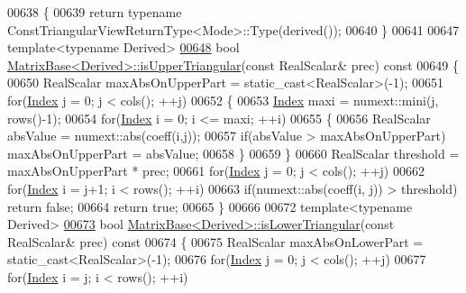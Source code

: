 \begin{DoxyCode}
00638 \textcolor{keyword}{}\{
00639   \textcolor{keywordflow}{return} \textcolor{keyword}{typename} ConstTriangularViewReturnType<Mode>::Type(derived());
00640 \}
00641 
00647 \textcolor{keyword}{template}<\textcolor{keyword}{typename} Derived>
\hyperlink{group___core___module_aae3ec1660bb4ac584220481c54ab4a64}{00648} \textcolor{keywordtype}{bool} \hyperlink{group___core___module_aae3ec1660bb4ac584220481c54ab4a64}{MatrixBase<Derived>::isUpperTriangular}(\textcolor{keyword}{const} RealScalar& prec)\textcolor{keyword}{
       const}
00649 \textcolor{keyword}{}\{
00650   RealScalar maxAbsOnUpperPart = \textcolor{keyword}{static\_cast<}RealScalar\textcolor{keyword}{>}(-1);
00651   \textcolor{keywordflow}{for}(\hyperlink{namespace_eigen_a62e77e0933482dafde8fe197d9a2cfde}{Index} j = 0; j < cols(); ++j)
00652   \{
00653     \hyperlink{namespace_eigen_a62e77e0933482dafde8fe197d9a2cfde}{Index} maxi = numext::mini(j, rows()-1);
00654     \textcolor{keywordflow}{for}(\hyperlink{namespace_eigen_a62e77e0933482dafde8fe197d9a2cfde}{Index} i = 0; i <= maxi; ++i)
00655     \{
00656       RealScalar absValue = numext::abs(coeff(i,j));
00657       \textcolor{keywordflow}{if}(absValue > maxAbsOnUpperPart) maxAbsOnUpperPart = absValue;
00658     \}
00659   \}
00660   RealScalar threshold = maxAbsOnUpperPart * prec;
00661   \textcolor{keywordflow}{for}(\hyperlink{namespace_eigen_a62e77e0933482dafde8fe197d9a2cfde}{Index} j = 0; j < cols(); ++j)
00662     \textcolor{keywordflow}{for}(\hyperlink{namespace_eigen_a62e77e0933482dafde8fe197d9a2cfde}{Index} i = j+1; i < rows(); ++i)
00663       \textcolor{keywordflow}{if}(numext::abs(coeff(i, j)) > threshold) \textcolor{keywordflow}{return} \textcolor{keyword}{false};
00664   \textcolor{keywordflow}{return} \textcolor{keyword}{true};
00665 \}
00666 
00672 \textcolor{keyword}{template}<\textcolor{keyword}{typename} Derived>
\hyperlink{group___core___module_a1e96c42d79a56f0a6ade30ce031e17eb}{00673} \textcolor{keywordtype}{bool} \hyperlink{group___core___module_a1e96c42d79a56f0a6ade30ce031e17eb}{MatrixBase<Derived>::isLowerTriangular}(\textcolor{keyword}{const} RealScalar& prec)\textcolor{keyword}{
       const}
00674 \textcolor{keyword}{}\{
00675   RealScalar maxAbsOnLowerPart = \textcolor{keyword}{static\_cast<}RealScalar\textcolor{keyword}{>}(-1);
00676   \textcolor{keywordflow}{for}(\hyperlink{namespace_eigen_a62e77e0933482dafde8fe197d9a2cfde}{Index} j = 0; j < cols(); ++j)
00677     \textcolor{keywordflow}{for}(\hyperlink{namespace_eigen_a62e77e0933482dafde8fe197d9a2cfde}{Index} i = j; i < rows(); ++i)

\end{DoxyCode}
